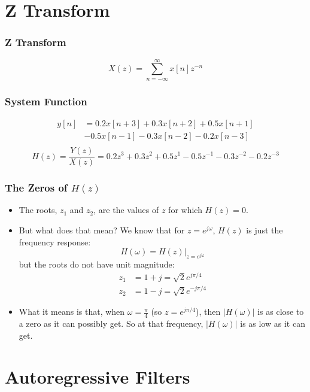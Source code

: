 \documentclass{beamer}
\begin{document}
\section[Z Transform]{Z Transform}
\setcounter{subsection}{1}

\begin{frame}
  \frametitle{Z Transform}
  \[
  X(z)   = \sum_{n=-\infty}^\infty x[n]z^{-n}
  \]
\end{frame}
\begin{frame}
  \frametitle{System Function}

  \begin{align*}
    y[n] &= 0.2x[n+3]+0.3x[n+2]+0.5x[n+1]\\
    &-0.5x[n-1]-0.3x[n-2]-0.2x[n-3]\\
  \end{align*}
  \[
  H(z)=\frac{Y(z)}{X(z)} = 0.2z^{3}+0.3z^{2}+0.5z^{1}-0.5z^{-1}-0.3z^{-2}-0.2z^{-3}
  \]
\end{frame}

\begin{frame}
  \frametitle{The Zeros of $H(z)$}

  \begin{itemize}
  \item The roots, $z_1$ and $z_2$, are the values of $z$ for which
    $H(z)=0$.
  \item But what does that mean?  We know that for $z=e^{j\omega}$,
    $H(z)$ is just the frequency response:
    \[
    H(\omega) = H(z)\vert_{z=e^{j\omega}}
    \]
    but the roots do not have unit magnitude:
    \begin{align*}
      z_1 &= 1+j =\sqrt{2}e^{j\pi/4}\\
      z_2 &= 1-j = \sqrt{2}e^{-j\pi/4}
    \end{align*}
  \item What it means is that, when $\omega=\frac{\pi}{4}$ (so
    $z=e^{j\pi/4}$), then $|H(\omega)|$ is as close to a zero as it
    can possibly get.  So at that frequency, $|H(\omega)|$ is as low
    as it can get.
  \end{itemize}
\end{frame}

\section[Autoregressive]{Autoregressive Filters}
\setcounter{subsection}{1}
\end{document}

